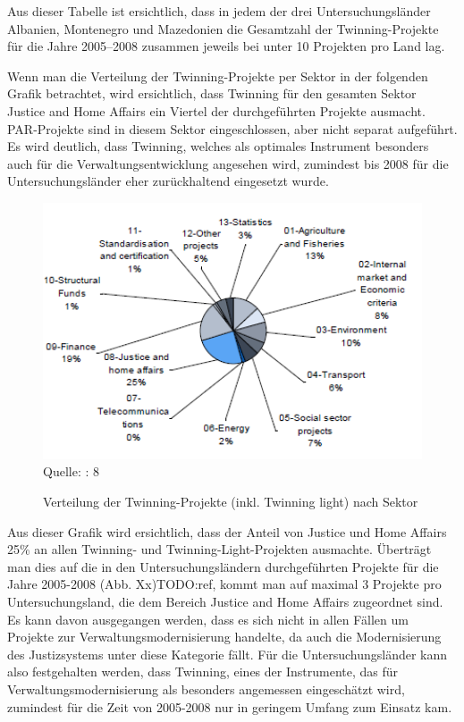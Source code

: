 Aus dieser Tabelle ist ersichtlich, dass in jedem der drei Untersuchungsländer Albanien, Montenegro und Mazedonien die Gesamtzahl der Twinning-Projekte für die Jahre 2005–2008 zusammen jeweils bei unter 10 Projekten pro Land lag.\par
Wenn man die Verteilung der Twinning-Projekte per Sektor in der folgenden Grafik betrachtet, wird ersichtlich, dass Twinning für den gesamten Sektor Justice and Home Affairs ein Viertel der durchgeführten Projekte ausmacht. PAR-Projekte sind in diesem Sektor eingeschlossen, aber nicht separat aufgeführt. Es wird deutlich, dass Twinning, welches als optimales Instrument besonders auch für die Verwaltungsentwicklung angesehen wird, zumindest bis 2008 für die Untersuchungsländer eher zurückhaltend eingesetzt wurde.
\begin{figure}[H]
  \centering
\caption{Verteilung der Twinning-Projekte (inkl. Twinning light) nach Sektor}
  \includegraphics[width=5in]{Material/TwinningProjects}\\
\scriptsize{Quelle: \cite{epec11}: 8}
\end{figure}
Aus dieser Grafik wird ersichtlich, dass der Anteil von Justice und Home Affairs 25\% an allen Twinning- und Twinning-Light-Projekten ausmachte. Überträgt man dies auf die in den Untersuchungsländern durchgeführten Projekte für die Jahre 2005-2008 (Abb. Xx)TODO:ref, kommt man auf maximal 3 Projekte pro Untersuchungsland, die dem Bereich Justice and Home Affairs zugeordnet sind. Es kann davon ausgegangen werden, dass es sich nicht in allen Fällen um Projekte zur Verwaltungsmodernisierung handelte, da auch die Modernisierung des Justizsystems unter diese Kategorie fällt. Für die Untersuchungsländer kann also festgehalten werden, dass Twinning, eines der Instrumente, das für Verwaltungsmodernisierung als besonders angemessen eingeschätzt wird, zumindest für die Zeit von 2005-2008 nur in geringem Umfang zum Einsatz kam.
